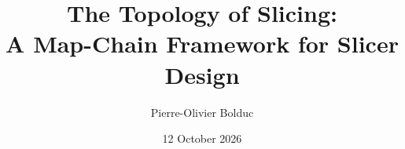 \documentclass[11pt,a4paper]{article}
\title{The Topology of Slicing:\\
  A Map-Chain Framework for Slicer Design}
\author{Pierre-Olivier Bolduc}
\date{12 October 2026}
\begin{document}
  \maketitle

  
  
  
  
  
  
  
  
  \label{main-text-end}

  \clearpage
  \appendix

  
  
  
  

  \clearpage
  
  \begingroup
    \small\raggedright
    \setlength{\bibsep}{2.5pt}
    
  \endgroup
\end{document}
